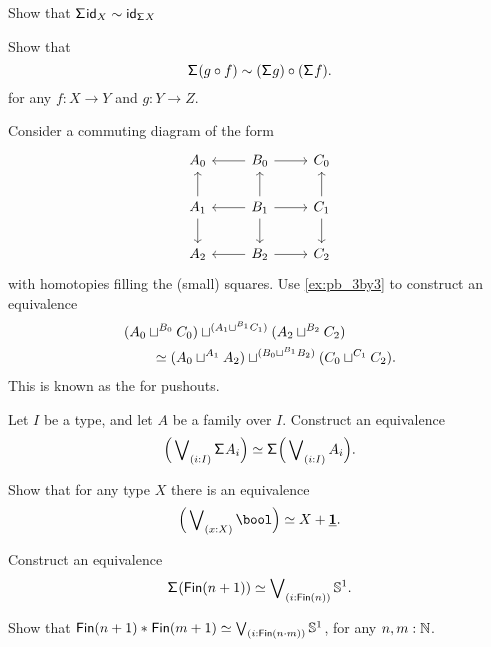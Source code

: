 \begin{exercises}
\begin{subexenum}
\item Show that $\susp \idfunc[X]\htpy\idfunc[\susp X]$
\item Show that
\begin{equation*}
\susp(g\circ f)\htpy (\susp g)\circ (\susp f).
\end{equation*}
for any $f:X\to Y$ and $g:Y\to Z$.
\end{subexenum}
\item Consider a commuting diagram of the form
\begin{equation*}
\begin{tikzcd}
A_0 & B_0 \arrow[l] \arrow[r] & C_0 \\
A_1 \arrow[u] \arrow[d] & B_1 \arrow[u] \arrow[r] \arrow[d] \arrow[l] & C_1 \arrow[u] \arrow[d] \\
A_2 & B_2 \arrow[l] \arrow[r] & C_2
\end{tikzcd}
\end{equation*}
with homotopies filling the (small) squares. Use \cref{ex:pb_3by3} to construct an equivalence
\begin{align*}
& (A_0\sqcup^{B_0} C_0) \sqcup^{(A_1\sqcup^{B_1} C_1)} (A_2 \sqcup^{B_2} C_2) \\
& \qquad \eqvsym (A_0 \sqcup^{A_1} A_2) \sqcup^{(B_0\sqcup^{B_1} B_2)} (C_0\sqcup^{C_1} C_2).
\end{align*}
This is known as the  for pushouts.
\item 
\begin{subexenum}
\item Let $I$ be a type, and let $A$ be a family over $I$. Construct an equivalence
\begin{equation*}
\eqv{\Big(\bigvee\nolimits_{(i:I)}\susp A_i\Big)}{\susp\Big(\bigvee\nolimits_{(i:I)}A_i\Big)}.
\end{equation*}
\item Show that for any type $X$ there is an equivalence
\begin{equation*}
\eqv{\Big(\bigvee\nolimits_{(x:X)}\bool\Big)}{X+\unit}.
\end{equation*}
\item Construct an equivalence
\begin{equation*}
\eqv{\susp(\mathsf{Fin}(n+1))}{\bigvee\nolimits_{(i:\mathsf{Fin}(n))}\sphere{1}}.
\end{equation*}
\end{subexenum}
\item Show that $\eqv{\join{\mathsf{Fin}(n+1)}{\mathsf{Fin}(m+1)}}{\bigvee\nolimits_{(i:\mathsf{Fin}(n\cdot m))}\sphere{1}}$, for any $n,m:\N$.

\end{exercises}
